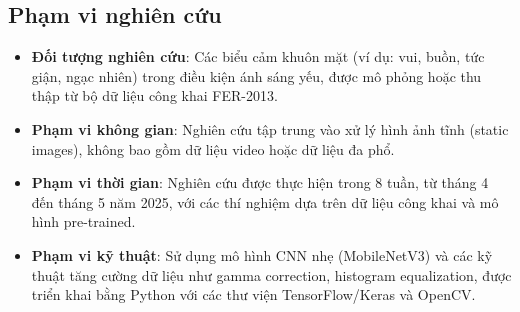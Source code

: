 \subsection{Phạm vi nghiên cứu}
\begin{itemize}
    \item \textbf{Đối tượng nghiên cứu}: Các biểu cảm khuôn mặt (ví dụ: vui, buồn, tức giận, ngạc nhiên) trong điều kiện ánh sáng yếu, được mô phỏng hoặc thu thập từ bộ dữ liệu công khai FER-2013.
    \item \textbf{Phạm vi không gian}: Nghiên cứu tập trung vào xử lý hình ảnh tĩnh (static images), không bao gồm dữ liệu video hoặc dữ liệu đa phổ.
    \item \textbf{Phạm vi thời gian}: Nghiên cứu được thực hiện trong 8 tuần, từ tháng 4 đến tháng 5 năm 2025, với các thí nghiệm dựa trên dữ liệu công khai và mô hình pre-trained.
    \item \textbf{Phạm vi kỹ thuật}: Sử dụng mô hình CNN nhẹ (MobileNetV3) và các kỹ thuật tăng cường dữ liệu như gamma correction, histogram equalization, được triển khai bằng Python với các thư viện TensorFlow/Keras và OpenCV.
\end{itemize}